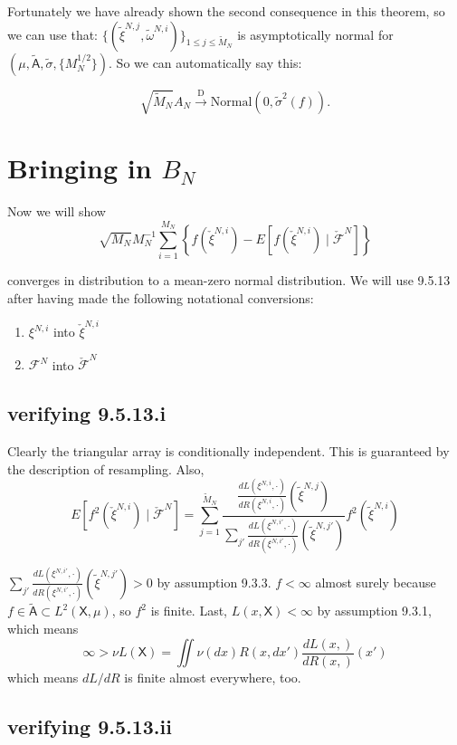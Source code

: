 \documentclass{article}
\begin{document}
Fortunately we have already shown the second consequence in this theorem, so we can use that: $\{(\tilde{\xi}^{N,j}, \tilde{\omega}^{N,i} ) \}_{1 \le j \le \tilde{M}_N}$ is asymptotically normal for $(\mu, \tilde{\mathsf{A}}, \tilde{\sigma}, \{M_N^{1/2}\})$. So we can automatically say this:

$$
\sqrt{\tilde{M}_N} A_N \overset{\text{D}}{\to} \text{Normal}(0, \tilde{\sigma}^2(f)).
$$

\section{Bringing in $B_N$}

Now we will show 
$$
\sqrt{M_N}  M_N^{-1} \sum_{i=1}^{M_N} \left\{  f(\check{\xi}^{N,i}) - E[f(\check{\xi}^{N,i}) \mid \check{\mathcal{F}}^N] \right\}
$$

converges in distribution to a mean-zero normal distribution. We will use 9.5.13 after having made the following notational conversions:

\begin{enumerate}
\item $\xi^{N,i}$ into $\check{\xi}^{N,i}$
\item $\mathcal{F}^N$ into $\check{\mathcal{F}}^N$
\end{enumerate} 


\subsection{verifying 9.5.13.i}

Clearly the triangular array is conditionally independent. This is guaranteed by the description of resampling. Also, 
$$
E[f^2(\check{\xi}^{N,i}) \mid \check{\mathcal{F}}^N] 
= \sum_{j=1}^{\tilde{M}_N} \frac{\frac{dL(\xi^{N,i},\cdot)}{dR(\xi^{N,i},\cdot)}(\tilde{\xi}^{N,j}) }{ \sum_{j'}\frac{dL(\xi^{N,i'},\cdot)}{dR(\xi^{N,i'},\cdot)}(\tilde{\xi}^{N,j'}) }f^2(\tilde{\xi}^{N,i}) 
$$

$\sum_{j'}\frac{dL(\xi^{N,i'},\cdot)}{dR(\xi^{N,i'},\cdot)}(\tilde{\xi}^{N,j'}) > 0$ by assumption 9.3.3. $f < \infty$ almost surely because $f \in \tilde{\mathsf{A}} \subset L^2(\mathsf{X}, \mu)$, so $f^2$ is finite. Last, $L(x,\mathsf{X}) < \infty$ by assumption 9.3.1, which means 
$$
\infty > \nu L(\mathsf{X}) = \iint \nu(dx) R(x,dx') \frac{dL(x,)}{dR(x,)}(x')
$$
which means $dL/dR$ is finite almost everywhere, too.

\subsection{verifying 9.5.13.ii}
\end{document}
